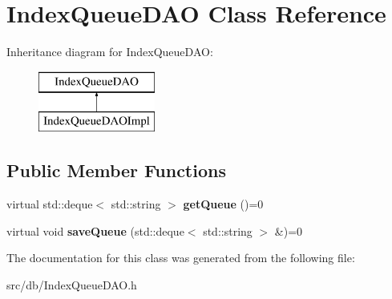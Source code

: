 \hypertarget{classIndexQueueDAO}{}\section{Index\+Queue\+D\+AO Class Reference}
\label{classIndexQueueDAO}
Inheritance diagram for Index\+Queue\+D\+AO\+:\begin{figure}[H]
\begin{center}
\leavevmode
\includegraphics[height=2.000000cm]{classIndexQueueDAO}
\end{center}
\end{figure}
\subsection*{Public Member Functions}
\begin{DoxyCompactItemize}
\item 
virtual std\+::deque$<$ std\+::string $>$ {\bfseries get\+Queue} ()=0\hypertarget{classIndexQueueDAO_ac0893a394138fab61537f74b2059ccc4}{}\label{classIndexQueueDAO_ac0893a394138fab61537f74b2059ccc4}

\item 
virtual void {\bfseries save\+Queue} (std\+::deque$<$ std\+::string $>$ \&)=0\hypertarget{classIndexQueueDAO_ac585c9d54d72efa12dbda23007e0d02d}{}\label{classIndexQueueDAO_ac585c9d54d72efa12dbda23007e0d02d}

\end{DoxyCompactItemize}


The documentation for this class was generated from the following file\+:\begin{DoxyCompactItemize}
\item 
src/db/Index\+Queue\+D\+A\+O.\+h\end{DoxyCompactItemize}
